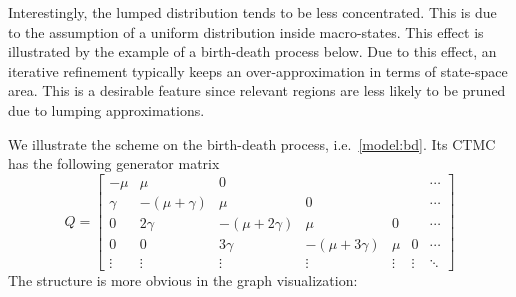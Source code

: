 Interestingly, the lumped distribution
tends to be less concentrated. %
This is due to the assumption of a
uniform distribution inside macro-states.
This effect is illustrated by the example of a birth-death process below.
Due to this effect, an iterative refinement typically keeps an over-approximation in terms of state-space area.
This is a desirable feature since relevant regions are less likely to be pruned due to lumping approximations.

\begin{example}
We illustrate the scheme on the birth-death process, i.e.\ \autoref{model:bd}.
Its \ac{CTMC} has the following generator matrix
\[
	Q = \begin{bmatrix}
		-\mu & \mu & 0 & & & &\cdots \\
		\gamma & -(\mu + \gamma) & \mu & 0 & && \cdots\\
		0 & 2 \gamma & -(\mu + 2\gamma) & \mu & 0 && \cdots \\
		0 & 0 & 3\gamma & -(\mu + 3\gamma) & \mu &0&\cdots \\
		\vdots & \vdots & \vdots & \vdots & \vdots & \vdots&\ddots
	\end{bmatrix}
\]
The structure is more obvious in the graph visualization:
\vspace{2em}\\
\end{example}

